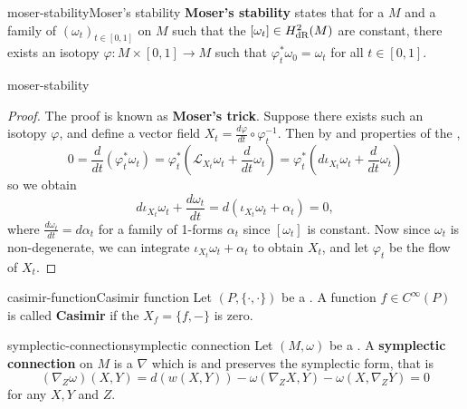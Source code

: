 \begin{topic}{moser-stability}{Moser's stability}
    \textbf{Moser's stability} states that for a   $M$ and a family of  $(\omega_t)_{t \in [0, 1]}$ on $M$ such that the  $[\omega_t] \in H^2_{\textup{dR}}(M)$ are constant, there exists an isotopy $\varphi : M \times [0, 1] \to M$ such that $\varphi_t^* \omega_0 = \omega_t$ for all $t \in [0, 1]$.
\end{topic}

\begin{example}{moser-stability}
    \begin{proof}
        The proof is known as \textbf{Moser's trick}. Suppose there exists such an isotopy $\varphi$, and define a vector field $X_t = \frac{d \varphi}{d t} \circ \varphi_t^{-1}$. Then by  and properties of the ,
        \[ 0 = \frac{d}{dt} \left(\varphi_t^* \omega_t\right) = \varphi_t^* \left(\mathcal{L}_{X_t} \omega_t + \frac{d}{dt} \omega_t \right) = \varphi_t^* \left(d \iota_{X_t} \omega_t + \frac{d}{dt} \omega_t \right) \]
        so we obtain
        \[ d \iota_{X_t} \omega_t + \frac{d \omega_t}{dt} = d(\iota_{X_t} \omega_t + \alpha_t) = 0 , \]
        where $\frac{d \omega_t}{d t} = d \alpha_t$ for a family of 1-forms $\alpha_t$ since $[\omega_t]$ is constant. Now since $\omega_t$ is non-degenerate, we can integrate $\iota_{X_t} \omega_t + \alpha_t$ to obtain $X_t$, and let $\varphi_t$ be the flow of $X_t$.
    \end{proof}
\end{example}

\begin{topic}{casimir-function}{Casimir function}
    Let $(P, \{ \cdot, \cdot \})$ be a . A function $f \in C^\infty(P)$ is called \textbf{Casimir} if the  $X_f = \{ f, - \}$ is zero.
\end{topic}

\begin{topic}{symplectic-connection}{symplectic connection}
    Let $(M, \omega)$ be a . A \textbf{symplectic connection} on $M$ is a  $\nabla$ which is  and preserves the symplectic form, that is
    \[ (\nabla_Z \omega)(X, Y) = d(w(X, Y)) - \omega(\nabla_Z X, Y) - \omega(X, \nabla_Z Y) = 0 \]
    for any  $X, Y$ and $Z$.
\end{topic}

